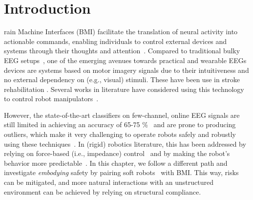 \section{Introduction}
rain Machine Interfaces (BMI) \citep{liu2024cognitive} facilitate the translation of neural activity into actionable commands, enabling individuals to control external devices and systems through their thoughts and attention~\citep{coyle2007brain,lee2017brain}. Compared to traditional bulky EEG setups~\citep{van2012brain}, one of the emerging avenues towards practical and wearable \glspl{EEG} devices are systems based on motor imagery signals due to their intuitiveness and no external dependency on (e.g., visual) stimuli. These have been use in stroke rehabilitation \citep{khan2020review}. Several works in literature have considered using this technology to control robot manipulators~\citep{schiatti2017soft,bhattacharyya2017motor, liu2018motor,aldini2019effect,lee2024noir}.

However, the state-of-the-art classifiers on few-channel, online \gls{EEG} signals are still limited in achieving an accuracy of 65-75 \si{\percent}~\citep{arpaia2022non, lee2024noir} and are prone to producing outliers, which make it very challenging to operate robots safely and robustly using these techniques~\citep{liu2024cognitive}. In (rigid) robotics literature, this has been addressed by relying on force-based (i.e., impedance) control~\citep{schiatti2017soft} and by making the robot's behavior more predictable~\citep{aldini2019effect}.
%
%
In this chapter, we follow a different path and investigate \textit{embodying} safety by pairing soft robots~\citep{rus2015design, della2020softencyclopedia} 
with \gls{BMI}. This way, risks can be mitigated, and more natural interactions with an unstructured environment can be achieved by relying on structural compliance.

